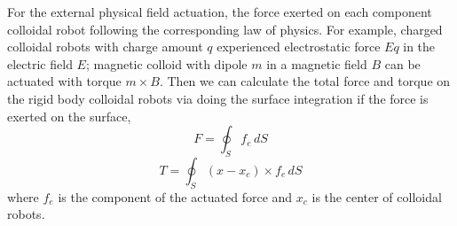 For the external physical field actuation, the force exerted on each component colloidal robot following the corresponding law of physics. For example, charged colloidal robots with charge amount $q$ experienced electrostatic force $Eq$ in the electric field $E$; magnetic colloid with dipole $m$ in a magnetic field $B$ can be actuated with torque $m\times B$.
Then we can calculate the total force and torque on the rigid body colloidal robots via doing the surface integration if the force is exerted on the surface,
\begin{equation}
    F=\oint_S f_e \,dS
\end{equation}
\begin{equation}
    T=\oint_S (x-x_c)\times f_e \,dS
\end{equation}
where $f_e$  is the component of the actuated force and $x_c$ is the center of colloidal robots.

